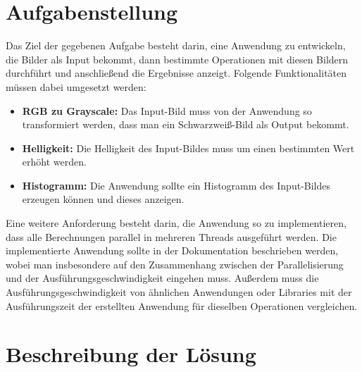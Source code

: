 \documentclass[11pt]{amsart}
\begin{document}
\newpage

\tableofcontents
\newpage


























\section{Aufgabenstellung}
Das Ziel der gegebenen Aufgabe besteht darin, eine Anwendung zu entwickeln, die Bilder als Input bekommt, dann bestimmte Operationen mit diesen Bildern durchführt und anschließend die Ergebnisse anzeigt. Folgende Funktionalitäten müssen dabei umgesetzt werden:
\begin{itemize}
\item \textbf{RGB zu Grayscale:} Das Input-Bild muss von der Anwendung so transformiert werden, dass man ein Schwarzweiß-Bild als Output bekommt.
\item \textbf{Helligkeit:} Die Helligkeit des Input-Bildes muss um einen bestimmten Wert erhöht werden.
\item \textbf{Histogramm:} Die Anwendung sollte ein Histogramm des Input-Bildes erzeugen können und dieses anzeigen.
\end{itemize}

Eine weitere Anforderung besteht darin, die Anwendung so zu implementieren, dass alle Berechnungen parallel in mehreren Threads ausgeführt werden. Die implementierte Anwendung sollte in der Dokumentation beschrieben werden, wobei man insbesondere auf den Zusammenhang zwischen der Parallelisierung und der Ausführungsgeschwindigkeit eingehen muss. Außerdem muss die Ausführungsgeschwindigkeit von ähnlichen Anwendungen oder Libraries mit der Ausführungszeit der erstellten Anwendung für dieselben Operationen vergleichen.



\newpage
\section{Beschreibung der Lösung}
\end{document}
